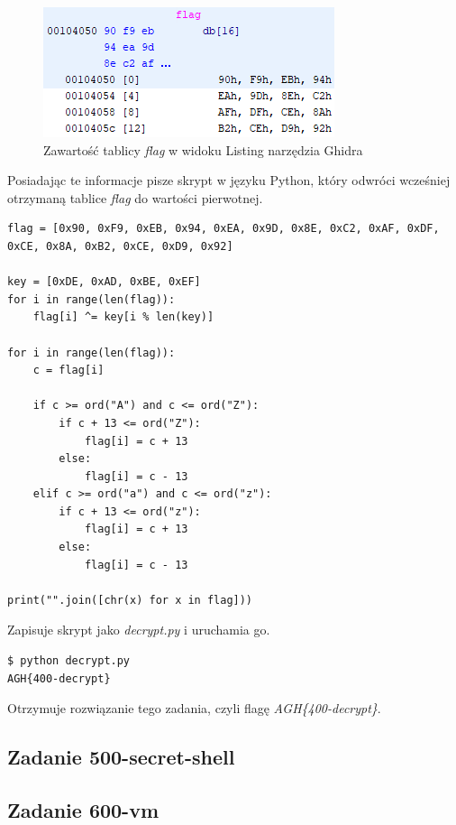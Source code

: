 \documentclass[polish,12pt]{aghthesis}
\begin{document}
\begin{figure}[H]
    \centering
    \includegraphics{400_flag}
    \caption{Zawartość tablicy \emph{flag} w widoku Listing narzędzia Ghidra}
    \label{fig:400_flag}
\end{figure}

Posiadając te informacje pisze skrypt w języku Python, który odwróci wcześniej otrzymaną
tablice \emph{flag} do wartości pierwotnej.

\begin{verbatim}
flag = [0x90, 0xF9, 0xEB, 0x94, 0xEA, 0x9D, 0x8E, 0xC2, 0xAF, 0xDF, 0xCE, 0x8A, 0xB2, 0xCE, 0xD9, 0x92]

key = [0xDE, 0xAD, 0xBE, 0xEF]
for i in range(len(flag)):
    flag[i] ^= key[i % len(key)]

for i in range(len(flag)):
    c = flag[i]

    if c >= ord("A") and c <= ord("Z"):
        if c + 13 <= ord("Z"):
            flag[i] = c + 13
        else:
            flag[i] = c - 13
    elif c >= ord("a") and c <= ord("z"):
        if c + 13 <= ord("z"):
            flag[i] = c + 13
        else:
            flag[i] = c - 13

print("".join([chr(x) for x in flag]))
\end{verbatim}

Zapisuje skrypt jako \emph{decrypt.py} i uruchamia go.

\begin{verbatim}
$ python decrypt.py
AGH{400-decrypt}
\end{verbatim}

Otrzymuje rozwiązanie tego zadania, czyli flagę \emph{AGH\{400-decrypt\}}.
\clearpage

\subsection{Zadanie 500-secret-shell}

\subsection{Zadanie 600-vm}
\end{document}
